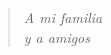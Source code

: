 \begin{verse}
\begin{flushright}
\vspace*{3cm}
\textit{A mi familia\\ 
	y a amigos}
\end{flushright}
\end{verse}
